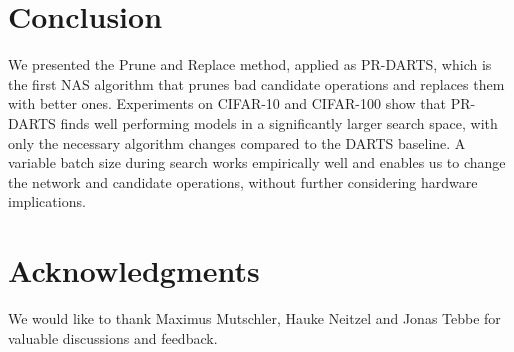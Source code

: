 \documentclass[conference]{IEEEtran}
\begin{document}



\section{Conclusion}
\label{s_conclusion}

We presented the Prune and Replace method, applied as PR-DARTS, which is the first NAS algorithm that prunes bad candidate operations and replaces them with better ones. Experiments on CIFAR-10 and CIFAR-100 show that PR-DARTS finds well performing models in a significantly larger search space, with only the necessary algorithm changes compared to the DARTS baseline.
A variable batch size during search works empirically well and enables us to change the network and candidate operations, without further considering hardware implications.





\section*{Acknowledgments}

We would like to thank Maximus Mutschler, Hauke Neitzel and Jonas Tebbe for valuable discussions and feedback.
\end{document}

